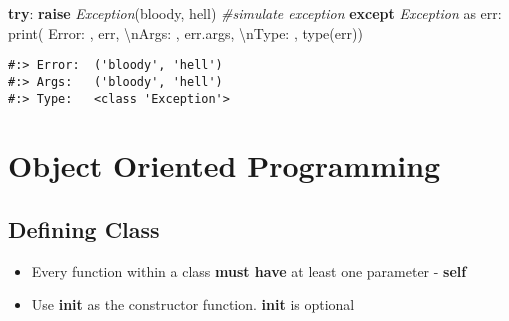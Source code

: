 \documentclass[
]{book}
\newenvironment{Shaded}{\begin{snugshade}}{\end{snugshade}}
\newcommand{\BuiltInTok}[1]{#1}
\newcommand{\CharTok}[1]{\textcolor[rgb]{0.5,0.5,0.5}{#1}}
\newcommand{\CommentTok}[1]{\textcolor[rgb]{0.37,0.37,0.37}{\textit{#1}}}
\newcommand{\ControlFlowTok}[1]{\textcolor[rgb]{0.27,0.27,0.27}{\textbf{#1}}}
\newcommand{\ImportTok}[1]{#1}
\newcommand{\NormalTok}[1]{#1}
\newcommand{\PreprocessorTok}[1]{\textcolor[rgb]{0.37,0.37,0.37}{\textit{#1}}}
\newcommand{\StringTok}[1]{\textcolor[rgb]{0.5,0.5,0.5}{#1}}
\providecommand{\tightlist}{%
  \setlength{\itemsep}{0pt}\setlength{\parskip}{0pt}}
\begin{document}
\begin{Shaded}
\begin{Highlighting}[]
\ControlFlowTok{try}\NormalTok{:}
  \ControlFlowTok{raise} \PreprocessorTok{Exception}\NormalTok{(}\StringTok{\textquotesingle{}bloody\textquotesingle{}}\NormalTok{, }\StringTok{\textquotesingle{}hell\textquotesingle{}}\NormalTok{)  }\CommentTok{\#simulate exception}
\ControlFlowTok{except} \PreprocessorTok{Exception} \ImportTok{as}\NormalTok{ err:}
  \BuiltInTok{print}\NormalTok{( }\StringTok{\textquotesingle{}Error: \textquotesingle{}}\NormalTok{, err,}
         \StringTok{\textquotesingle{}}\CharTok{\textbackslash{}n}\StringTok{Args:  \textquotesingle{}}\NormalTok{, err.args,}
         \StringTok{\textquotesingle{}}\CharTok{\textbackslash{}n}\StringTok{Type:  \textquotesingle{}}\NormalTok{, }\BuiltInTok{type}\NormalTok{(err))}
\end{Highlighting}
\end{Shaded}

\begin{verbatim}
#:> Error:  ('bloody', 'hell') 
#:> Args:   ('bloody', 'hell') 
#:> Type:   <class 'Exception'>
\end{verbatim}

\hypertarget{object-oriented-programming}{%
\chapter{Object Oriented Programming}\label{object-oriented-programming}}

\hypertarget{defining-class}{%
\section{Defining Class}\label{defining-class}}

\begin{itemize}
\tightlist
\item
  Every function within a class \textbf{must have} at least one parameter - \textbf{self}\\
\item
  Use \textbf{init} as the constructor function. \textbf{init} is optional
\end{itemize}
\end{document}
